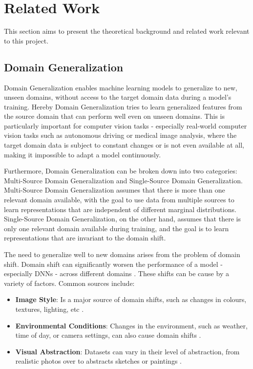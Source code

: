 \section{Related Work}
This section aims to present the theoretical background and related work relevant to this project.

\subsection{Domain Generalization}

Domain Generalization enables machine learning models to generalize to new, unseen domains, without access to the target domain data during a model's training. Hereby Domain Generalization tries to learn generalized features from the source domain that can perform well even on unseen domains. This is particularly important for computer vision tasks - especially real-world computer vision tasks such as autonomous driving or medical image analysis, where the target domain data is subject to constant changes or is not even available at all, making it impossible to adapt a model continuously. \cite{liDeeperBroaderArtier2017,liuDEJAVUContinual2023,blanchardGeneralizingSeveralRelated2011}

Furthermore, Domain Generalization can be broken down into two categories: Multi-Source Domain Generalization and Single-Source Domain Generalization.
Multi-Source Domain Generalization assumes that there is more than one relevant domain available, with the goal to use data from multiple sources to learn representations that are independent of different marginal distributions. \cite{blanchardGeneralizingSeveralRelated2011}
Single-Source Domain Generalization, on the other hand, assumes that there is only one relevant domain available during training, and the goal is to learn representations that are invariant to the domain shift.

The need to generalize well to new domains arises from the problem of domain shift. Domain shift can significantly worsen the performance of a model - especially DNNs - across different domains \cite{muandetDomainGeneralizationInvariant2013}. These shifts can be cause by a variety of factors. Common sources include:
\begin{itemize}
    \item \textbf{Image Style}: Is a major source of domain shifts, such as changes in colours, textures, lighting, etc \cite{zhouMixStyleNeuralNetworks2023}.
    \item \textbf{Environmental Conditions}: Changes in the environment, such as weather, time of day, or camera settings, can also cause domain shifts \cite{schwonbergAugmentationbasedDomainGeneralization2023}.
    \item \textbf{Visual Abstraction}: Datasets can vary in their level of abstraction, from realistic photos over to abstracts sketches or paintings \cite{liDeeperBroaderArtier2017}.
\end{itemize}

